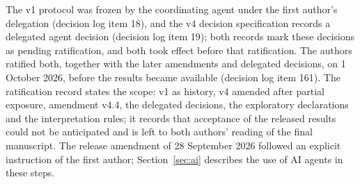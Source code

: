 The v1 protocol was frozen by the coordinating agent under the first author's delegation (decision log item 18), and the v4 decision specification records a delegated agent decision (decision log item 19); both records mark these decisions as pending ratification, and both took effect before that ratification. The authors ratified both, together with the later amendments and delegated decisions, on 1 October 2026, before the results became available (decision log item 161). %
The ratification record states the scope: v1 as history, v4 amended after partial exposure, amendment v4.4, the delegated decisions, the exploratory declarations and the interpretation rules; it records that acceptance of the released results could not be anticipated and is left to both authors' reading of the final manuscript. The release amendment of 28 September 2026 followed an explicit instruction of the first author; Section~\ref{sec:ai} describes the use of AI agents in these steps.

\clearpage
